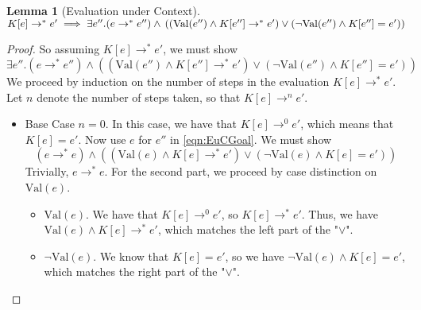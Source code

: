 \documentclass[twoside,11pt,openright]{report}
\newtheorem{lemma}[theorem]{Lemma}
\theoremstyle{definition}
\newcommand{\expr}{e}
\newcommand{\elctx}{K}
\newcommand{\step}{\rightarrow}
\newcommand{\stepS}{\rightarrow^*}
\newcommand{\Val}[1]{\mathrm{Val}(#1)}
\begin{document}
\begin{lemma}[Evaluation under Context]\label{lem:EuC}
  $ \elctx[\expr] \stepS \expr' \implies 
    \exists \expr'' . (\expr \stepS \expr'') \land\\
    \left( (\Val{\expr''} \land \elctx[\expr''] \stepS \expr') \lor
    (\neg \Val{\expr''} \land \elctx[\expr''] = \expr') \right)
    $
\end{lemma}
\begin{proof}
  So assuming $\elctx[\expr] \stepS \expr'$, we must show
  \begin{equation}\label{eqn:EuCGoal}
    \exists \expr'' . (\expr \stepS \expr'') \land 
    \left( (\Val{\expr''} \land \elctx[\expr''] \stepS \expr') \lor
    (\neg \Val{\expr''} \land \elctx[\expr''] = \expr') \right)
  \end{equation}
  We proceed by induction on the number of steps in the evaluation $\elctx[\expr] \stepS \expr'$. Let $n$ denote the number of steps taken, so that $\elctx[\expr] \step^n \expr'$.
  \begin{itemize}
    \item Base Case $n = 0$. In this case, we have that $\elctx[\expr] \step^0 \expr'$, which means that $\elctx[\expr] = \expr'$. Now use $\expr$ for $\expr''$ in \ref{eqn:EuCGoal}. We must show
    \begin{equation*}
      (\expr \stepS \expr) \land 
      \left( (\Val{\expr} \land \elctx[\expr] \stepS \expr') \lor
      (\neg \Val{\expr} \land \elctx[\expr] = \expr') \right)
    \end{equation*}
    Trivially, $\expr \stepS \expr$. For the second part, we proceed by case distinction on $\Val{\expr}$.
    \begin{itemize}
      \item $\Val{\expr}$. We have that $\elctx[\expr] \step^0 \expr'$, so $\elctx[\expr] \stepS \expr'$. Thus, we have $\Val{\expr} \land \elctx[\expr] \stepS \expr'$, which matches the left part of the "$\lor$".
      \item $\neg \Val{\expr}$. We know that $\elctx[\expr] = \expr'$, so we have $\neg \Val{\expr} \land \elctx[\expr] = \expr'$, which matches the right part of the "$\lor$".
    \end{itemize}
    

\end{itemize}
\end{proof}
\end{document}

